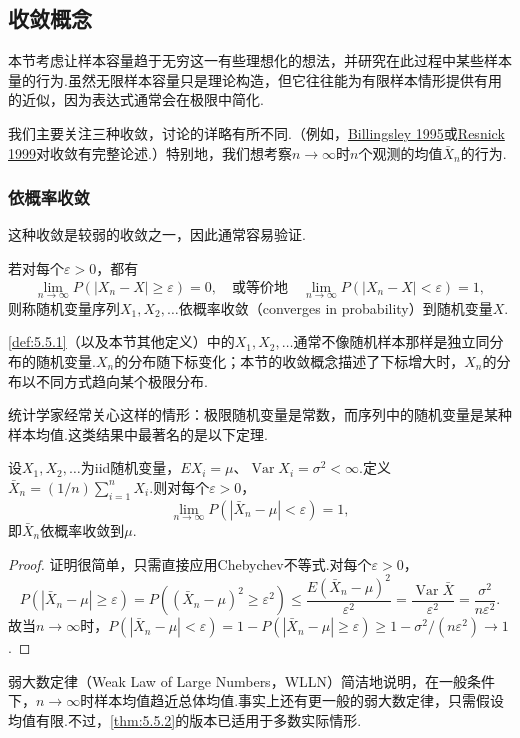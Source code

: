 \subsection{收敛概念}\label{sec:5.5}
本节考虑让样本容量趋于无穷这一有些理想化的想法，并研究在此过程中某些样本量的行为.虽然无限样本容量只是理论构造，但它往往能为有限样本情形提供有用的近似，因为表达式通常会在极限中简化.

我们主要关注三种收敛，讨论的详略有所不同.（例如，\hyperref[bib:source33]{Billingsley 1995}或\hyperref[bib:source251]{Resnick 1999}对收敛有完整论述.）特别地，我们想考察$n\to\infty$时$n$个观测的均值$\bar X_n$的行为.
\subsubsection{依概率收敛}\label{sec:5.5.1}
这种收敛是较弱的收敛之一，因此通常容易验证.
\begin{definition}\label{def:5.5.1}
若对每个$\varepsilon>0$，都有
$$\lim_{n\to\infty}P(|X_n-X|\ge\varepsilon)=0,\quad\text{或等价地}\quad\lim_{n\to\infty}P(|X_n-X|<\varepsilon)=1,$$
则称随机变量序列$X_1,X_2,\ldots$依概率收敛（converges in probability）到随机变量$X$.
\end{definition}
\autoref{def:5.5.1}（以及本节其他定义）中的$X_1,X_2,\ldots$通常不像随机样本那样是独立同分布的随机变量.$X_n$的分布随下标变化；本节的收敛概念描述了下标增大时，$X_n$的分布以不同方式趋向某个极限分布.

统计学家经常关心这样的情形：极限随机变量是常数，而序列中的随机变量是某种样本均值.这类结果中最著名的是以下定理.
\begin{theorem}[弱大数定律]\label{thm:5.5.2}
设$X_1,X_2,\ldots$为iid随机变量，$EX_i=\mu$、$\operatorname{Var}X_i=\sigma^2<\infty$.定义$\bar X_n=(1/n)\sum_{i=1}^nX_i$.则对每个$\varepsilon>0$，
$$\lim_{n\to\infty}P(|\bar X_n-\mu|<\varepsilon)=1,$$
即$\bar X_n$依概率收敛到$\mu$.
\end{theorem}
\begin{proof}
证明很简单，只需直接应用Chebychev不等式.对每个$\varepsilon>0$，
$$P(|\bar X_n-\mu|\ge\varepsilon)=P((\bar X_n-\mu)^2\ge\varepsilon^2)\le\frac{E(\bar X_n-\mu)^2}{\varepsilon^2}=\frac{\operatorname{Var}\bar X}{\varepsilon^2}=\frac{\sigma^2}{n\varepsilon^2}.$$
故当$n\to\infty$时，$P(|\bar X_n-\mu|<\varepsilon)=1-P(|\bar X_n-\mu|\ge\varepsilon)\ge1-\sigma^2/(n\varepsilon^2)\to1$.
\end{proof}
弱大数定律（Weak Law of Large Numbers，WLLN）简洁地说明，在一般条件下，$n\to\infty$时样本均值趋近总体均值.事实上还有更一般的弱大数定律，只需假设均值有限.不过，\autoref{thm:5.5.2}的版本已适用于多数实际情形.

